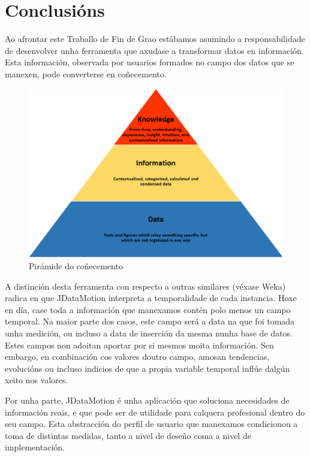 \chapter{Conclusións}

Ao afrontar este Traballo de Fin de Grao estábamos asumindo a responsabilidade de desenvolver unha ferramenta que axudase a transformar datos en información. Esta información, observada por usuarios formados no campo dos datos que se manexen, pode converterse en coñecemento.

\begin{figure}
\centering
\includegraphics[width=\textwidth,height=\textheight,keepaspectratio]{figuras/piramide}
\caption{Pirámide do coñecemento}
\label{piramide}
\end{figure}

A distinción desta ferramenta con respecto a outras similares (véxase Weka) radica en que JDataMotion interpreta a temporalidade de cada instancia. Hoxe en día, case toda a información que manexamos contén polo menos un campo temporal. Na maior parte dos casos, este campo será a data na que foi tomada unha medición, ou incluso a data de inserción da mesma nunha base de datos. Estes campos non adoitan aportar por si mesmos moita información. Sen embargo, en combinación cos valores doutro campo, amosan tendencias, evolucións ou incluso indicios de que a propia variable temporal inflúe dalgún xeito nos valores.

Por unha parte, JDataMotion é unha aplicación que soluciona necesidades de información reais, e que pode ser de utilidade para calquera profesional dentro do seu campo. Esta abstracción do perfil de usuario que manexamos condicionou a toma de distintas medidas, tanto a nivel de deseño coma a nivel de implementación.


